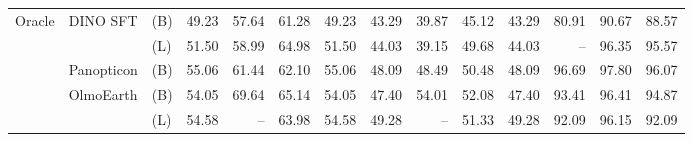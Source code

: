 \begin{tabular}{lll | r r r r | r r r r | r r r}
  \midrule
  \multirow{5}{*}{Oracle} & \multirow{2}{*}{DINO SFT} & (B) & 49.23 & 57.64 & 61.28 & 49.23 & 43.29 & 39.87 & 45.12 & 43.29 & 80.91 & 90.67 & 88.57 \\
   &  & (L) & 51.50 & 58.99 & 64.98 & 51.50 & 44.03 & 39.15 & 49.68 & 44.03 & -- & 96.35 & 95.57 \\
   & Panopticon & (B) & 55.06 & 61.44 & 62.10 & 55.06 & 48.09 & 48.49 & 50.48 & 48.09 & 96.69 & 97.80 & 96.07 \\
   & \multirow{2}{*}{OlmoEarth} & (B) & 54.05 & 69.64 & 65.14 & 54.05 & 47.40 & 54.01 & 52.08 & 47.40 & 93.41 & 96.41 & 94.87 \\
   &  & (L) & 54.58 & -- & 63.98 & 54.58 & 49.28 & -- & 51.33 & 49.28 & 92.09 & 96.15 & 92.09 \\
\bottomrule
\end{tabular}

\bigskip

